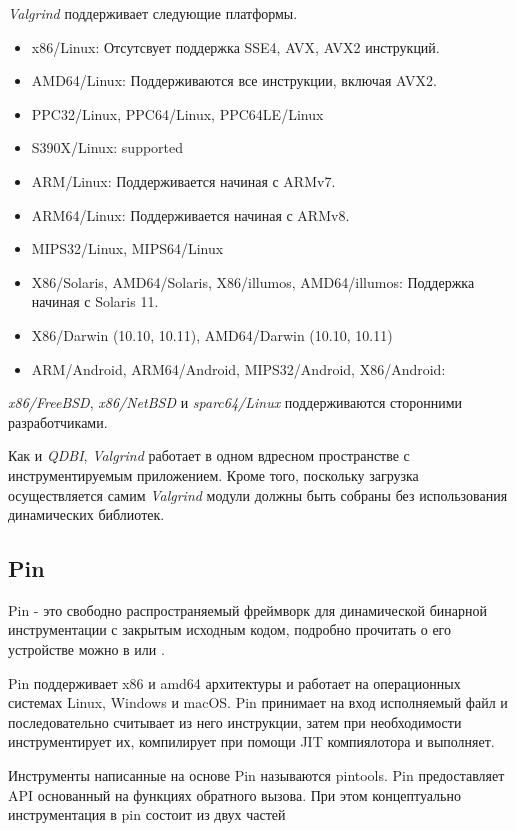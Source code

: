 \emph{Valgrind} поддерживает следующие платформы.

\begin{itemize}

    \item x86/Linux: Отсутсвует поддержка SSE4, AVX, AVX2 инструкций.
    \item AMD64/Linux: Поддерживаются все инструкции, включая AVX2.
    \item PPC32/Linux, PPC64/Linux, PPC64LE/Linux
    \item S390X/Linux: supported
    \item ARM/Linux: Поддерживается начиная с ARMv7.
    \item ARM64/Linux: Поддерживается начиная с ARMv8.
    \item MIPS32/Linux, MIPS64/Linux
    \item X86/Solaris, AMD64/Solaris, X86/illumos, AMD64/illumos: Поддержка начиная с Solaris 11.
    \item X86/Darwin (10.10, 10.11), AMD64/Darwin (10.10, 10.11)
    \item ARM/Android, ARM64/Android, MIPS32/Android, X86/Android:
\end{itemize}

\emph{x86/FreeBSD}, \emph{x86/NetBSD} и \emph{sparc64/Linux} поддерживаются сторонними разработчиками.

Как и \emph{QDBI}, \emph{Valgrind} работает в одном вдресном пространстве с инструментируемым приложением. Кроме того, поскольку загрузка осуществляется самим \emph{Valgrind} модули должны быть собраны без использования динамических библиотек.

\subsection{Pin}

Pin - это свободно распространяемый фреймворк для динамической бинарной инструментации с закрытым исходным кодом, подробно прочитать о его устройстве можно в \cite{PIN} или \cite{PBA}.

Pin поддерживает x86 и amd64 архитектуры и работает на операционных системах Linux, Windows и macOS. Pin принимает на вход исполняемый файл и последовательно считывает из него инструкции, затем при необходимости инструментирует их, компилирует при помощи JIT компиялотора и выполняет.

Инструменты написанные на основе Pin называются pintools. Pin предоставляет API основанный на функциях обратного вызова. При этом концептуально инструментация в pin состоит из двух частей

